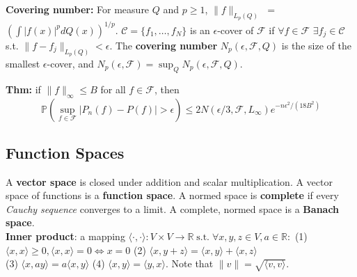 \documentclass[10pt,twocolumn]{article}
\begin{document}
    \textbf{Covering number:} For measure $Q$ and $p\geq 1$, $\|f\|_{L_p(Q)}$ $=$ $\left( \int |f(x)|^p dQ(x) \right)^{1/p}$.
    $\mathcal{C} = \{ f_1,\ldots,f_N \}$ is an $\epsilon$-cover of $\mathcal{F}$ if $\forall f \in \mathcal{F}$ $\exists f_j \in \mathcal{C}$ 
    s.t. $\| f - f_j  \|_{L_p(Q)} < \epsilon$. The \textbf{covering number} $N_p(\epsilon,\mathcal{F},Q)$ is the size of the smallest 
    $\epsilon$-cover, and $N_p(\epsilon,\mathcal{F}) = \sup_Q N_p(\epsilon,\mathcal{F},Q)$.

    \textbf{Thm:} if $\| f \|_{\infty} \leq B$ for all $f \in \mathcal{F}$, then
    \begin{equation}
        \mathbb{P}\left( \sup_{f \in \mathcal{F}} |P_n(f) - P(f)| > \epsilon \right) 
        \leq 2N(\epsilon/3, \mathcal{F}, L_{\infty}) e^{-n\epsilon^2 / (18B^2)}
    \end{equation}

\subsection*{Function Spaces}
    A \textbf{vector space} is closed under addition and scalar multiplication. 
    A vector space of functions is a \textbf{function space}. 
    A normed space is \textbf{complete} if every \emph{Cauchy sequence} converges to a limit. 
    A complete, normed space is a \textbf{Banach space}.\\
    \textbf{Inner product}: a mapping $\langle\cdot,\cdot\rangle: V \times V \rightarrow \mathbb{R} \; \text{s.t.} \; \forall x,y,z \in V, a \in \mathbb{R}:$
    (1) $\langle x,x \rangle \geq 0, \langle x,x \rangle = 0 \Leftrightarrow x = 0$ (2) $\langle x,y+z \rangle  = \langle x,y \rangle + \langle x,z \rangle$ \\
    (3) $\langle x, ay \rangle = a\langle x,y \rangle$ (4) $\langle x,y \rangle = \langle y,x \rangle$. Note that $\|v\| = \sqrt{\langle v,v  \rangle}$.
\end{document}
